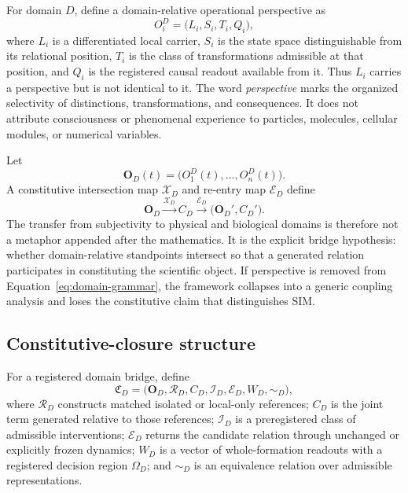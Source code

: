 \documentclass[11pt,a4paper]{article}
\begin{document}
For domain $D$, define a domain-relative operational perspective as
\begin{equation}
 O_i^D=\bigl(L_i,S_i,T_i,Q_i\bigr),
 \label{eq:domain-perspective}
\end{equation}
where $L_i$ is a differentiated local carrier, $S_i$ is the state space distinguishable from its relational position, $T_i$ is the class of transformations admissible at that position, and $Q_i$ is the registered causal readout available from it. Thus $L_i$ carries a perspective but is not identical to it. The word \emph{perspective} marks the organized selectivity of distinctions, transformations, and consequences. It does not attribute consciousness or phenomenal experience to particles, molecules, cellular modules, or numerical variables.

Let
\begin{equation}
 \mathbf O_D(t)=\bigl(O_1^D(t),\ldots,O_n^D(t)\bigr).
\end{equation}
A constitutive intersection map $\mathcal X_D$ and re-entry map $\mathcal E_D$ define
\begin{equation}
 \mathbf O_D
 \xrightarrow{\mathcal X_D}
 C_D
 \xrightarrow{\mathcal E_D}
 \bigl(\mathbf O_D',C_D'\bigr).
 \label{eq:domain-grammar}
\end{equation}
The transfer from subjectivity to physical and biological domains is therefore not a metaphor appended after the mathematics. It is the explicit bridge hypothesis: whether domain-relative standpoints intersect so that a generated relation participates in constituting the scientific object. If perspective is removed from Equation~\eqref{eq:domain-grammar}, the framework collapses into a generic coupling analysis and loses the constitutive claim that distinguishes SIM.

\subsection{Constitutive-closure structure}

For a registered domain bridge, define
\begin{equation}
 \mathfrak C_D=
 \bigl(\mathbf O_D,\mathcal R_D,C_D,\mathcal I_D,
       \mathcal E_D,W_D,\sim_D\bigr),
 \label{eq:closure-structure}
\end{equation}
where $\mathcal R_D$ constructs matched isolated or local-only references; $C_D$ is the joint term generated relative to those references; $\mathcal I_D$ is a preregistered class of admissible interventions; $\mathcal E_D$ returns the candidate relation through unchanged or explicitly frozen dynamics; $W_D$ is a vector of whole-formation readouts with a registered decision region $\Omega_D$; and $\sim_D$ is an equivalence relation over admissible representations.
\end{document}
